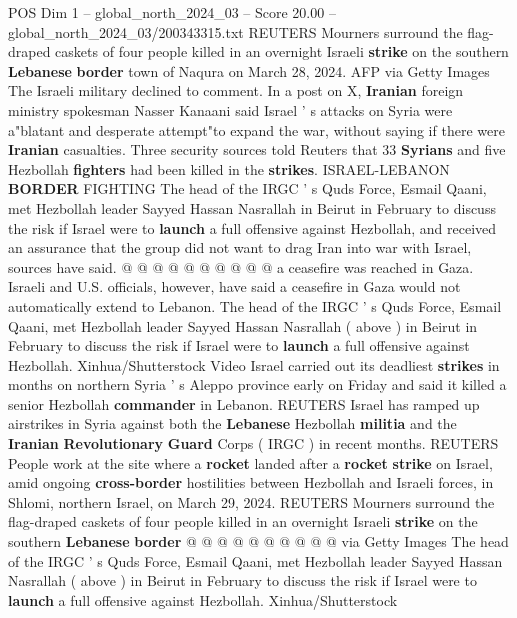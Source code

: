 \begin{textsample}{POS Dim 1 – global\_north\_2024\_03 – Score 20.00 – global\_north\_2024\_03/200343315.txt}
REUTERS Mourners surround the flag-draped caskets of four people killed in an overnight Israeli \textbf{strike} on the southern \textbf{Lebanese} \textbf{border} town of Naqura on March 28, 2024.
AFP via Getty Images The Israeli military declined to comment.
In a post on X, \textbf{Iranian} foreign ministry spokesman Nasser Kanaani said Israel ' s attacks on Syria were a"blatant and desperate attempt"to expand the war, without saying if there were \textbf{Iranian} casualties.
Three security sources told Reuters that 33 \textbf{Syrians} and five Hezbollah \textbf{fighters} had been killed in the \textbf{strikes}.
ISRAEL-LEBANON \textbf{BORDER} FIGHTING The head of the IRGC ' s Quds Force, Esmail Qaani, met Hezbollah leader Sayyed Hassan Nasrallah in Beirut in February to discuss the risk if Israel were to \textbf{launch} a full offensive against Hezbollah, and received an assurance that the group did not want to drag Iran into war with Israel, sources have said. @ @ @ @ @ @ @ @ @ @ a ceasefire was reached in Gaza.
Israeli and U.S. officials, however, have said a ceasefire in Gaza would not automatically extend to Lebanon.
The head of the IRGC ' s Quds Force, Esmail Qaani, met Hezbollah leader Sayyed Hassan Nasrallah ( above ) in Beirut in February to discuss the risk if Israel were to \textbf{launch} a full offensive against Hezbollah.
Xinhua/Shutterstock Video Israel carried out its deadliest \textbf{strikes} in months on northern Syria ' s Aleppo province early on Friday and said it killed a senior Hezbollah \textbf{commander} in Lebanon.
REUTERS Israel has ramped up airstrikes in Syria against both the \textbf{Lebanese} Hezbollah \textbf{militia} and the \textbf{Iranian} \textbf{Revolutionary} \textbf{Guard} Corps ( IRGC ) in recent months.
REUTERS People work at the site where a \textbf{rocket} landed after a \textbf{rocket} \textbf{strike} on Israel, amid ongoing \textbf{cross-border} hostilities between Hezbollah and Israeli forces, in Shlomi, northern Israel, on March 29, 2024.
REUTERS Mourners surround the flag-draped caskets of four people killed in an overnight Israeli \textbf{strike} on the southern \textbf{Lebanese} \textbf{border} @ @ @ @ @ @ @ @ @ @ via Getty Images The head of the IRGC ' s Quds Force, Esmail Qaani, met Hezbollah leader Sayyed Hassan Nasrallah ( above ) in Beirut in February to discuss the risk if Israel were to \textbf{launch} a full offensive against Hezbollah.
Xinhua/Shutterstock

\end{textsample}
